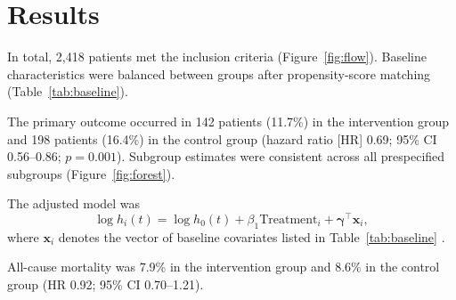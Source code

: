 \section{Results}
\label{sec:results}

In total, 2,418 patients met the inclusion criteria (Figure~\ref{fig:flow}). Baseline characteristics were balanced between groups after propensity-score matching \cite{austin2011introduction} (Table~\ref{tab:baseline}).

The primary outcome occurred in 142 patients (11.7\%) in the intervention group and 198 patients (16.4\%) in the control group (hazard ratio [HR] 0.69; 95\% CI 0.56--0.86; $p = 0.001$). Subgroup estimates were consistent across all prespecified subgroups (Figure~\ref{fig:forest}).

The adjusted model was
\begin{equation}
  \log h_i(t) = \log h_0(t) + \beta_1 \text{Treatment}_i + \boldsymbol{\gamma}^\top \mathbf{x}_i ,
  \label{eq:cox}
\end{equation}
where $\mathbf{x}_i$ denotes the vector of baseline covariates listed in Table~\ref{tab:baseline} \cite{cox1972regression, therneau2000modeling}.

All-cause mortality was 7.9\% in the intervention group and 8.6\% in the control group (HR 0.92; 95\% CI 0.70--1.21).
